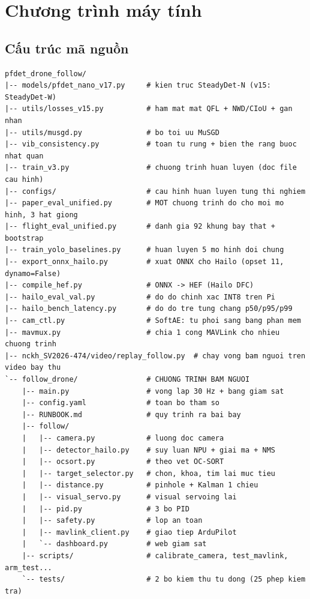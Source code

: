\chapter{Chương trình máy tính}
\label{pl:b}

\section{Cấu trúc mã nguồn}

\begin{lstlisting}
pfdet_drone_follow/
|-- models/pfdet_nano_v17.py     # kien truc SteadyDet-N (v15: SteadyDet-W)
|-- utils/losses_v15.py          # ham mat mat QFL + NWD/CIoU + gan nhan
|-- utils/musgd.py               # bo toi uu MuSGD
|-- vib_consistency.py           # toan tu rung + bien the rang buoc nhat quan
|-- train_v3.py                  # chuong trinh huan luyen (doc file cau hinh)
|-- configs/                     # cau hinh huan luyen tung thi nghiem
|-- paper_eval_unified.py        # MOT chuong trinh do cho moi mo hinh, 3 hat giong
|-- flight_eval_unified.py       # danh gia 92 khung bay that + bootstrap
|-- train_yolo_baselines.py      # huan luyen 5 mo hinh doi chung
|-- export_onnx_hailo.py         # xuat ONNX cho Hailo (opset 11, dynamo=False)
|-- compile_hef.py               # ONNX -> HEF (Hailo DFC)
|-- hailo_eval_val.py            # do do chinh xac INT8 tren Pi
|-- hailo_bench_latency.py       # do do tre tung chang p50/p95/p99
|-- cam_ctl.py                   # SoftAE: tu phoi sang bang phan mem
|-- mavmux.py                    # chia 1 cong MAVLink cho nhieu chuong trinh
|-- nckh_SV2026-474/video/replay_follow.py  # chay vong bam nguoi tren video bay thu
`-- follow_drone/                # CHUONG TRINH BAM NGUOI
    |-- main.py                  # vong lap 30 Hz + bang giam sat
    |-- config.yaml              # toan bo tham so
    |-- RUNBOOK.md               # quy trinh ra bai bay
    |-- follow/
    |   |-- camera.py            # luong doc camera
    |   |-- detector_hailo.py    # suy luan NPU + giai ma + NMS
    |   |-- ocsort.py            # theo vet OC-SORT
    |   |-- target_selector.py   # chon, khoa, tim lai muc tieu
    |   |-- distance.py          # pinhole + Kalman 1 chieu
    |   |-- visual_servo.py      # visual servoing lai
    |   |-- pid.py               # 3 bo PID
    |   |-- safety.py            # lop an toan
    |   |-- mavlink_client.py    # giao tiep ArduPilot
    |   `-- dashboard.py         # web giam sat
    |-- scripts/                 # calibrate_camera, test_mavlink, arm_test...
    `-- tests/                   # 2 bo kiem thu tu dong (25 phep kiem tra)
\end{lstlisting}

